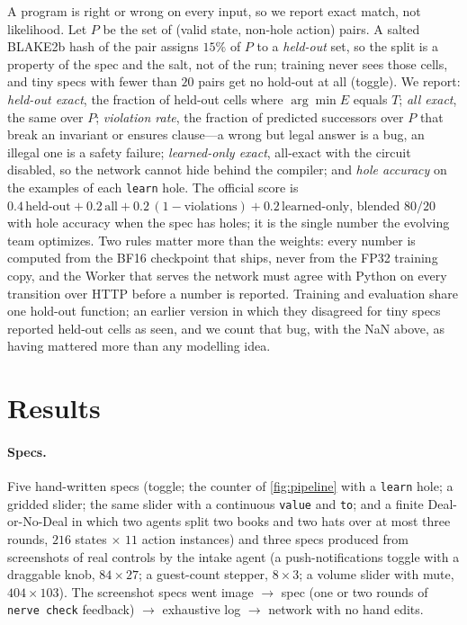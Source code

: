 \documentclass{article}
\theoremstyle{plain}
\theoremstyle{definition}
\theoremstyle{remark}
\begin{document}
A program is right or wrong on every input, so we report exact match, not likelihood. Let $P$ be the set of (valid state, non-hole action) pairs. A salted BLAKE2b hash of the pair assigns $15\%$ of $P$ to a \emph{held-out} set, so the split is a property of the spec and the salt, not of the run; training never sees those cells, and tiny specs with fewer than $20$ pairs get no hold-out at all (toggle). We report:
\emph{held-out exact}, the fraction of held-out cells where $\arg\min E$ equals $T$;
\emph{all exact}, the same over $P$;
\emph{violation rate}, the fraction of predicted successors over $P$ that break an invariant or ensures clause---a wrong but legal answer is a bug, an illegal one is a safety failure;
\emph{learned-only exact}, all-exact with the circuit disabled, so the network cannot hide behind the compiler;
and \emph{hole accuracy} on the examples of each \texttt{learn} hole. The official score is $0.4\,\text{held-out}+0.2\,\text{all}+0.2\,(1-\text{violations})+0.2\,\text{learned-only}$, blended $80/20$ with hole accuracy when the spec has holes; it is the single number the evolving team optimizes. Two rules matter more than the weights: every number is computed from the BF16 checkpoint that ships, never from the FP32 training copy, and the Worker that serves the network must agree with Python on every transition over HTTP before a number is reported. Training and evaluation share one hold-out function; an earlier version in which they disagreed for tiny specs reported held-out cells as seen, and we count that bug, with the NaN above, as having mattered more than any modelling idea.

\section{Results}
\label{sec:results}

\paragraph{Specs.} Five hand-written specs (toggle; the counter of \cref{fig:pipeline} with a \texttt{learn} hole; a gridded slider; the same slider with a continuous \texttt{value} and \texttt{to}; and a finite Deal-or-No-Deal in which two agents split two books and two hats over at most three rounds, $216$ states $\times$ $11$ action instances) and three specs produced from screenshots of real controls by the intake agent (a push-notifications toggle with a draggable knob, $84\times27$; a guest-count stepper, $8\times3$; a volume slider with mute, $404\times103$). The screenshot specs went image $\to$ spec (one or two rounds of \texttt{nerve check} feedback) $\to$ exhaustive log $\to$ network with no hand edits.
\end{document}
